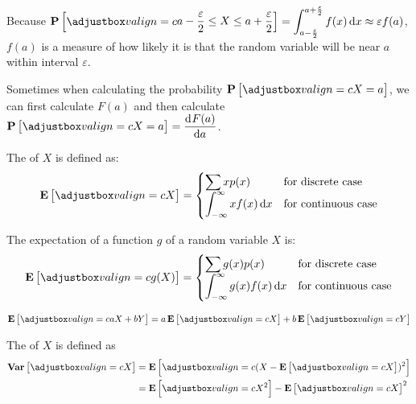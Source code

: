 Because $\probability{ a - \frac{\varepsilon}{2} \leq X \leq a + \frac{\varepsilon}{2} } =\displaystyle \int_{a - \frac{\varepsilon}{2}}^{a + \frac{\varepsilon}{2}} f(x) \dif{x} \approx \varepsilon f(a)  $, $f(a)$ is a measure of how likely it is that the random variable will be near $a$ within interval $\varepsilon$.


Sometimes when calculating the probability $\probability{X=a}$, we can first calculate $F(a)$ and then calculate $\probability{X=a} = \dod{F(a)}{a}$.

\begin{definition}[expectation]
    The  of $X$ is defined as:
    \begin{equation}
        \expect{X} = \begin{cases}
            \displaystyle \sum x p(x) & \text{for discrete case} \\
            \displaystyle \int_{-\infty}^{\infty} x f(x) \dif{x} & \text{for continuous case}
        \end{cases}
    \end{equation}
\end{definition}




\begin{theorem}
    The expectation of a function $g$  of a random variable $X$ is:
    \begin{equation}
        \expect{g(X)} = \begin{cases}
            \displaystyle \sum g(x) p(x) & \text{for discrete case} \\
            \displaystyle \int_{-\infty}^{\infty} g(x) f(x) \dif{x} & \text{for continuous case}
        \end{cases}
    \end{equation}
\end{theorem}

\begin{theorem}
    \begin{equation}
        \expect{aX + bY} = a \expect{X} + b \expect{Y}
    \end{equation}    
\end{theorem}

\begin{definition}[variance]
    The  of $X$ is defined as
    \begin{equation}
        \begin{aligned}
            \variance{X} &= \expect{(X - \expect{X})^2} \\
            &= \expect{X^2} - \expect{X}^2
        \end{aligned}
    \end{equation}
\end{definition}


